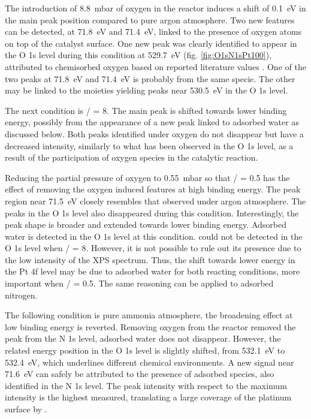 The introduction of \qty{8.8}{\milli\bar} of oxygen in the reactor induces a shift of \qty{0.1}{\eV} in the main peak position compared to pure argon atmosphere.
Two new features can be detected, at \qty{71.8}{\eV} and \qty{71.4}{\eV}, linked to the presence of oxygen atoms on top of the catalyst surface.
One new peak was clearly identified to appear in the O 1s level during this condition at \qty{529.7}{\eV} (fig. \ref{fig:O1sN1sPt100}), attributed to chemisorbed oxygen based on reported literature values \parencite{Rienks2003, Kondratenko2006}.
One of the two peaks at \qty{71.8}{\eV} and \qty{71.4}{\eV} is probably from the same specie.
The other may be linked to the moieties yielding peaks near \qty{530.5}{\eV} in the O 1s level.

The next condition is / = \num{8}.
The main peak is shifted towards lower binding energy, possibly from the appearance of a new peak linked to adsorbed water as discussed below.
Both peaks identified under oxygen do not disappear but have a decreased intensity, similarly to what has been observed in the O 1s level, as a result of the participation of oxygen species in the catalytic reaction.

Reducing the partial pressure of oxygen to \qty{0.55}{\milli\bar} so that / = \num{0.5} has the effect of removing the oxygen induced features at high binding energy.
The peak region near \qty{71.5}{\eV} closely resembles that observed under argon atmosphere.
The  peaks in the O 1s level also disappeared during this condition.
Interestingly, the peak shape is broader and extended towards lower binding energy.
Adsorbed water is detected in the O 1s level at this condition.
 could not be detected in the O 1s level when / = 8.
However, it is not possible to rule out its presence due to the low intensity of the XPS spectrum.
Thus, the shift towards lower energy in the Pt 4f level may be due to adsorbed water for both reacting conditions, more important when / = 0.5.
The same reasoning can be applied to adsorbed nitrogen.

The following condition is pure ammonia atmosphere, the broadening effect at low binding energy is reverted.
Removing oxygen from the reactor removed the  peak from the N 1s level, adsorbed water does not disappear.
However, the related energy position in the O 1s level is slightly shifted, from \qty{532.1}{\eV} to \qty{532.4}{\eV}, which underlines different chemical environments.
A new signal near \qty{71.6}{\eV} can safely be attributed to the presence of adsorbed  species, also identified in the N 1s level.
The peak intensity with respect to the maximum intensity is the highest measured, translating a large coverage of the platinum surface by .


